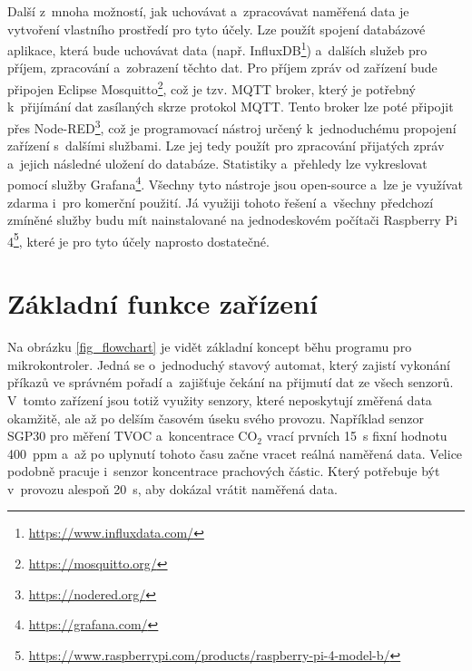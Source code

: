 Další z~mnoha možností, jak uchovávat a~zpracovávat naměřená data je vytvoření vlastního prostředí pro tyto účely. Lze použít spojení databázové aplikace, která bude uchovávat data (např. InfluxDB\footnote{\url{https://www.influxdata.com/}}) a~dalších služeb pro příjem, zpracování a~zobrazení těchto dat. Pro příjem zpráv od zařízení bude připojen Eclipse Mosquitto\footnote{\url{https://mosquitto.org/}}, což je tzv. MQTT broker, který je potřebný k~přijímání dat zasílaných skrze protokol MQTT. Tento broker lze poté připojit přes Node-RED\footnote{\url{https://nodered.org/}}, což je programovací nástroj určený k~jednoduchému propojení zařízení s~dalšími službami. Lze jej tedy použít pro zpracování přijatých zpráv a~jejich následné uložení do databáze. Statistiky a~přehledy lze vykreslovat pomocí služby Grafana\footnote{\url{https://grafana.com/}}. Všechny tyto nástroje jsou open-source a~lze je využívat zdarma i~pro komerční použití. Já využiji tohoto řešení a~všechny předchozí zmíněné služby budu mít nainstalované na jednodeskovém počítači Raspberry Pi 4\footnote{\url{https://www.raspberrypi.com/products/raspberry-pi-4-model-b/}}, které je pro tyto účely naprosto dostatečné.

\section{Základní funkce zařízení}

Na obrázku \ref{fig_flowchart} je vidět základní koncept běhu programu pro mikrokontroler. Jedná se o~jednoduchý stavový automat, který zajistí vykonání příkazů ve správném pořadí a~zajišťuje čekání na přijmutí dat ze všech senzorů. V~tomto zařízení jsou totiž využity senzory, které neposkytují změřená data okamžitě, ale až po delším časovém úseku svého provozu. Například senzor SGP30 pro měření TVOC a~koncentrace CO$_2$ vrací prvních \SI{15}{\second} fixní hodnotu 400~ppm a~až po uplynutí tohoto času začne vracet reálná naměřená data. Velice podobně pracuje i~senzor koncentrace prachových částic. Který potřebuje být v~provozu alespoň \SI{20}{\second}, aby dokázal vrátit naměřená data.

